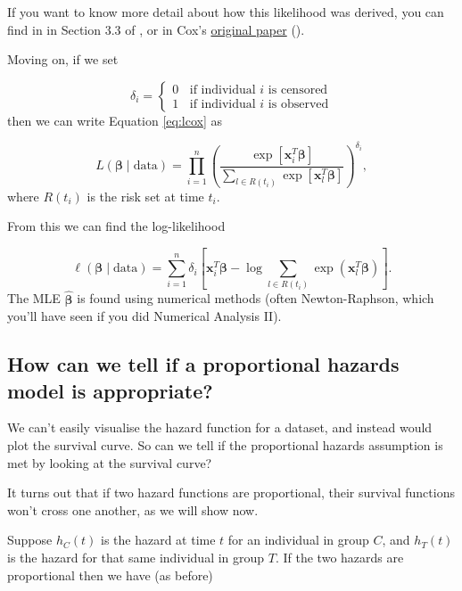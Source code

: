\documentclass[
  openany]{book}
\theoremstyle{definition}
\theoremstyle{definition}
\theoremstyle{definition}
\theoremstyle{definition}
\theoremstyle{remark}
\begin{document}
If you want to know more detail about how this likelihood was derived, you can find in in Section 3.3 of \citet{collett_surv}, or in Cox's \href{https://www.jstor.org/stable/pdf/2985181.pdf}{original paper} (\citet{cox1972regression}).

Moving on, if we set

\[
\delta_i = 
\begin{cases}
0\;\;\text{ if individual }i\text{ is censored}\\
1\;\;\text{ if individual }i\text{ is observed}
\end{cases}
\]
then we can write Equation \eqref{eq:lcox} as

\[L\left(\boldsymbol\beta\mid{\text{data}}\right) =   \prod\limits_{i=1}^n\left(\frac{\exp\left[\mathbf{x}_i^T\boldsymbol\beta\right]}{\sum\limits_{l\in R\left(t_i\right)}{\exp\left[\mathbf{x}_l^T\boldsymbol\beta\right]}}\right)^{\delta_i},\]
where \(R\left(t_i\right)\) is the risk set at time \(t_i\).

From this we can find the log-likelihood

\[\ell\left(\boldsymbol\beta\mid{\text{data}}\right) = \sum\limits_{i=1}^n \delta_i\left[\mathbf{x}_i^T\boldsymbol\beta - \log\sum\limits_{l\in R\left(t_i\right)}\exp\left(\mathbf{x}_l^T\boldsymbol\beta\right)\right].\]
The MLE \(\hat{\boldsymbol\beta}\) is found using numerical methods (often Newton-Raphson, which you'll have seen if you did Numerical Analysis II).

\subsection*{How can we tell if a proportional hazards model is appropriate?}\label{how-can-we-tell-if-a-proportional-hazards-model-is-appropriate}

We can't easily visualise the hazard function for a dataset, and instead would plot the survival curve. So can we tell if the proportional hazards assumption is met by looking at the survival curve?

It turns out that if two hazard functions are proportional, their survival functions won't cross one another, as we will show now.

Suppose \(h_C\left(t\right)\) is the hazard at time \(t\) for an individual in group \(C\), and \(h_T\left(t\right)\) is the hazard for that same individual in group \(T\). If the two hazards are proportional then we have (as before)
\end{document}
